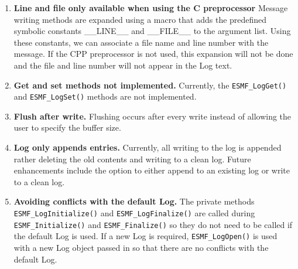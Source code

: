 %

\begin{enumerate}

\item {\bf Line and file only available when using the C preprocessor}
Message writing methods are expanded using a macro that adds the
predefined symbolic constants \_\_LINE\_\_ and \_\_FILE\_\_ to the argument list.
Using these constants, we can associate a file name and line number with the
message.  If the CPP preprocessor is not used, this expansion will not be done
and the file and line number will not appear in the Log text.

\item{\bf Get and set methods not implemented.}
Currently, the {\tt ESMF\_LogGet()} and {\tt ESMF\_LogSet()} methods are 
not implemented.

\item{\bf Flush after write.}
Flushing occurs after every write instead of allowing the user to
specify the buffer size.

\item{\bf Log only appends entries.}
Currently, all writing to the log is appended rather deleting the old contents
and writing to a clean log.  Future enhancements include the option to either
append to an existing log or write to a clean log.

\item{\bf Avoiding conflicts with the default Log.}
The private methods {\tt ESMF\_LogInitialize()} and {\tt ESMF\_LogFinalize()} 
are called during {\tt ESMF\_Initialize()} and
{\tt ESMF\_Finalize()} so they do not need to be called if the default 
Log is used.  If a new Log is required, {\tt ESMF\_LogOpen()} is used with a 
new Log object passed in so that there are no conflicts with the default Log.

\end{enumerate}
